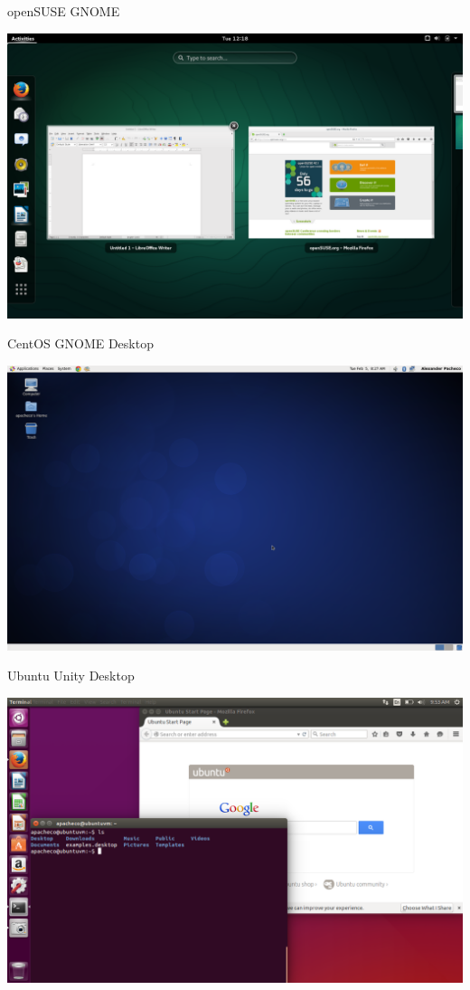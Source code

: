 \documentclass[10pt,t]{beamer}
\begin{document}
\begin{frame}{openSUSE GNOME}
  \begin{center}
    \includegraphics[width=\textwidth]{./opensuse-gnome}
  \end{center}
\end{frame}
\begin{frame}{CentOS GNOME Desktop}
  \begin{center}
    \includegraphics[width=\textwidth]{./CentOS6_3}
  \end{center}
\end{frame}
\begin{frame}{Ubuntu Unity Desktop}
  \begin{center}
    \includegraphics[width=\textwidth]{./Ubuntu}
  \end{center}
\end{frame}
\end{document}
